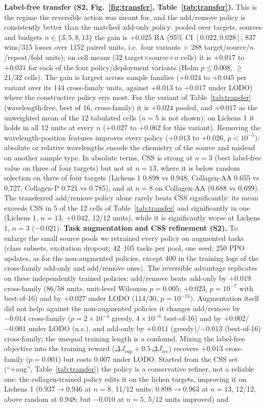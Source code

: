 \documentclass[conference]{IEEEtran}
\newcommand{\JS}{J_{\mathrm{sup}}}
\newcommand{\JR}{J_{\mathrm{rec}}}
\begin{document}
\textbf{Label-free transfer (S2, Fig.~\ref{fig:transfer}, Table~\ref{tab:transfer}).} This is the regime the reversible action was meant for, and the add/remove policy is consistently better than the matched add-only policy: pooled over targets, sources and budgets $n\in\{3,5,8,13\}$ the gain is $+0.025$ BA (95\% CI $[0.022, 0.028]$, 837 wins/315 losses over 1152 paired units, i.e.\ four variants $\times$ 288 target/source/$n$/repeat/fold units); on cell means (32 target$\times$source$\times n$ cells) it is $+0.017$ to $+0.031$ for each of the four policy/deployment variants (Holm $p\le0.008$, $\ge$21/32 cells). The gain is largest across sample families ($+0.024$ to $+0.045$ per variant over its 144 cross-family units, against $+0.013$ to $+0.017$ under LODO) where the constructive policy errs most. For the variant of Table~\ref{tab:transfer} (wavelength-free, best of 16, cross-family) it is $+0.024$ pooled, and $+0.017$ as the unweighted mean of the 12 tabulated cells ($n=5$ is not shown); on Lichens 1 it holds in all 12 units at every $n$ ($+0.027$ to $+0.062$ for this variant). Removing the wavelength-position features improves every policy ($+0.013$ to $+0.026$, $p<10^{-5}$): absolute or relative wavelengths encode the chemistry of the source and mislead on another sample type. In absolute terms, CSS is strong at $n=3$ (best label-free value on three of four targets) but not at $n=13$, where it is below random selection on three of four targets (Lichens 1 0.898 vs 0.948, Collagen-AA 0.655 vs 0.727, Collagen-P 0.721 vs 0.785), and at $n=8$ on Collagen-AA (0.688 vs 0.699). The transferred add/remove policy alone rarely beats CSS significantly: its mean exceeds CSS in 5 of the 12 cells of Table~\ref{tab:transfer} and significantly in one (Lichens 1, $n=13$, $+0.042$, 12/12 units), while it is significantly worse at Lichens 1, $n=3$ ($-0.021$). \textbf{Task augmentation and CSS refinement (S2).} To enlarge the small source pools we retrained every policy on augmented tasks (class subsets, excitation dropout; 42--105 tasks per pool, one seed; 250 PPO updates, as for the non-augmented policies, except 400 in the training logs of the cross-family add-only and add/remove ones). The reversible advantage replicates on these independently trained policies: add/remove beats add-only by $+0.019$ cross-family (86/58 units, unit-level Wilcoxon $p=0.005$; $+0.023$, $p=10^{-7}$ with best-of-16) and by $+0.027$ under LODO (114/30, $p=10^{-13}$). Augmentation itself did not help: against the non-augmented policies it changes add/remove by $-0.014$ cross-family ($p=2\times10^{-4}$ greedy, $4\times10^{-6}$ best-of-16) and by $+0.002$/$-0.001$ under LODO (n.s.), and add-only by $+0.011$ (greedy)/$-0.013$ (best-of-16) cross-family; the unequal training length is a confound. Mixing the label-free objective into the training reward ($\Delta\JS+0.5\,\Delta\JR$) recovers $+0.013$ cross-family ($p=0.001$) but costs $0.007$ under LODO. Started from the CSS set (``+aug'', Table~\ref{tab:transfer}) the policy is a conservative refiner, not a reliable one: the collagen-trained policy edits it on the lichen targets, improving it on Lichens 1 (0.937$\rightarrow$0.946 at $n=8$, 11/12 units; 0.898$\rightarrow$0.963 at $n=13$, 12/12, above random at 0.948; but $-0.010$ at $n=5$, 5/12 units improved) and 
\end{document}
